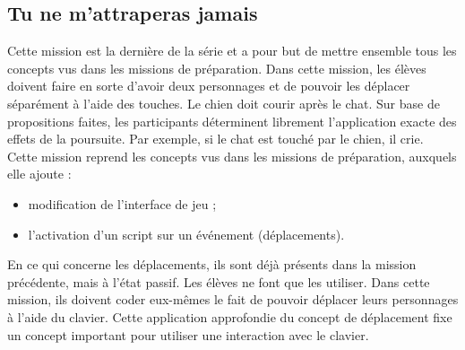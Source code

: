 \subsection{Tu ne m'attraperas jamais}
\label{chien-chat}
Cette \gls{mission} est la dernière de la série et a pour but de mettre ensemble tous les concepts vus dans les \glspl{mission} de préparation. Dans cette \gls{mission}, les élèves doivent faire en sorte d'avoir deux personnages et de pouvoir les déplacer séparément à l'aide des touches. Le chien doit courir après le chat. Sur base de propositions faites, les participants déterminent librement l'application exacte des effets de la poursuite. Par exemple, si le chat est touché par le chien, il crie.\\

Cette \gls{mission} reprend les concepts vus dans les \glspl{mission} de préparation, auxquels elle ajoute :
\begin{itemize}
\item modification de l'interface de jeu ;
\item l'activation d'un \gls{script} sur un événement (déplacements).
\end{itemize}

En ce qui concerne les déplacements, ils sont déjà présents dans la \gls{mission} précédente, mais à l'état passif. Les élèves ne font que les utiliser. Dans cette \gls{mission}, ils doivent coder eux-mêmes le fait de pouvoir déplacer leurs personnages à l'aide du clavier. Cette application approfondie du concept de déplacement fixe un concept important pour utiliser une interaction avec le clavier.

